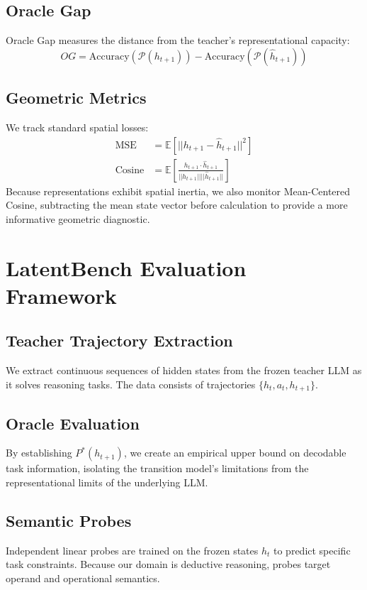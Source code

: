 \documentclass[conference]{IEEEtran}
\begin{document}
\subsection{Oracle Gap}
Oracle Gap measures the distance from the teacher's representational capacity:
\begin{equation}
OG = \text{Accuracy}(\mathcal{P}(h_{t+1})) - \text{Accuracy}(\mathcal{P}(\hat h_{t+1}))
\end{equation}

\subsection{Geometric Metrics}
We track standard spatial losses:
\begin{align}
\operatorname{MSE} &= \mathbb{E}[||h_{t+1} - \hat h_{t+1}||^2] \\
\operatorname{Cosine} &= \mathbb{E}\left[\frac{h_{t+1} \cdot \hat h_{t+1}}{||h_{t+1}|| ||\hat h_{t+1}||}\right]
\end{align}
Because representations exhibit spatial inertia, we also monitor Mean-Centered Cosine, subtracting the mean state vector before calculation to provide a more informative geometric diagnostic.

\section{LatentBench Evaluation Framework}

\subsection{Teacher Trajectory Extraction}
We extract continuous sequences of hidden states from the frozen teacher LLM as it solves reasoning tasks. The data consists of trajectories $\{h_t, a_t, h_{t+1}\}$.

\subsection{Oracle Evaluation}
By establishing $P^*(h_{t+1})$, we create an empirical upper bound on decodable task information, isolating the transition model's limitations from the representational limits of the underlying LLM.

\subsection{Semantic Probes}
Independent linear probes are trained on the frozen states $h_t$ to predict specific task constraints. Because our domain is deductive reasoning, probes target operand and operational semantics.
\end{document}
